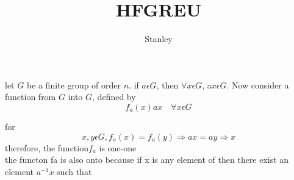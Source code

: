 \documentclass[10pt,a4paper]{article}
\author{Stanley}
\title{HFGREU}
\begin{document}
	
let ${G}$ be a finite group of order ${n}$. if  $a \epsilon G$, then $\forall x \epsilon G$, a${x}\epsilon G$. Now consider a function from ${G}$ into $G$, defined by
$$f_{a}\left(x\right){ax}\quad\forall{x}\epsilon{G}$$

for\\
$${x,y}\epsilon{G},f_{a}\left(x\right)=f_{a}\left(y\right)\Rightarrow{ax}={ay}\Rightarrow{x}$$
therefore, the function${f_{a}}$ is one-one\\
the functon {fa} is also onto because if {x} is any element of then there exist an element ${a^{-1}x}$                                          such that
	
\end{document}
